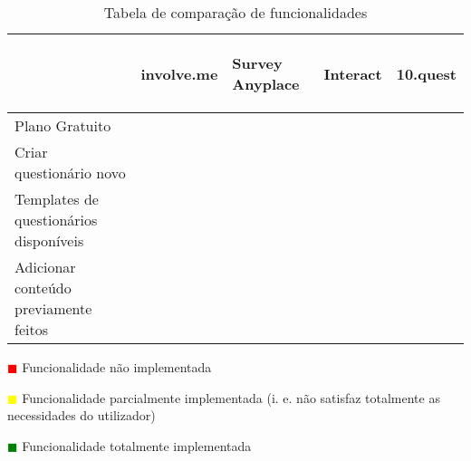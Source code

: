 \renewcommand{\arraystretch}{2}
\setlength\arrayrulewidth{1pt}
\begin{table}[!ht]  
	\begin{center}
		\begin{tabular}{|p{4cm}|p{0.1cm}|p{0.1cm}|p{0.1cm}|p{0.1cm}|}
			\cline{2-5}
			\multicolumn{1}{c|}{} & \hspace{0.2cm}\begin{sideways}involve.me\end{sideways} & \hspace{0.4cm}\begin{sideways}Survey Anyplace\end{sideways} & \hspace{0.2cm}\begin{sideways}Interact\end{sideways} &\hspace{0.2cm}\begin{sideways} 10.quest\end{sideways}\\ \hline
			
			
			Plano Gratuito & \cellcolor{yellow!80}   & \cellcolor{red!80}  & \cellcolor{red!80} & \cellcolor{yellow!80}  \\ \hline
			
			Criar questionário novo & \cellcolor{green!80}  & \cellcolor{green!80}  & \cellcolor{green!80} & \cellcolor{green!80} \\ \hline
			
			Templates de questionários disponíveis& \cellcolor{green!80}  & \cellcolor{green!80} & \cellcolor{green!80} & \cellcolor{red!80}  \\ \hline		
			
			Adicionar conteúdo previamente feitos & \cellcolor{red!80}   & \cellcolor{red!80}  & \cellcolor{red!80} & \cellcolor{green!80}  \\ \hline
			
			
			
		\end{tabular}
	\end{center}
	\hspace{1.2cm}	\textcolor{red}{$\blacksquare$} Funcionalidade não implementada
	
	\hspace{1.2cm}     \textcolor{yellow}{$\blacksquare$} Funcionalidade parcialmente implementada (i. e. não satisfaz totalmente as necessidades do utilizador)
	
	\hspace{1.2cm}     \textcolor{green}{$\blacksquare$} Funcionalidade totalmente implementada 
	\begin{center}
		\caption{Tabela de comparação de funcionalidades}
		\label{tab:comparacao1}
	\end{center}
\end{table}

